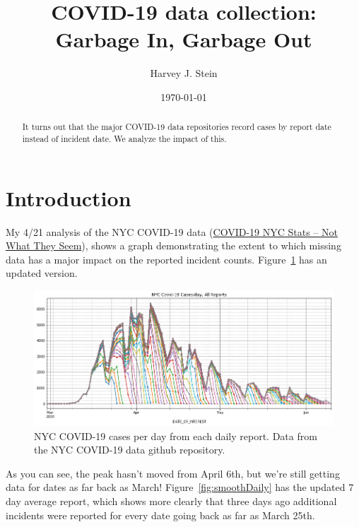\documentclass[10pt,reqno]{amsart}
\author{Harvey J. Stein}
\date{\today}
\begin{document}
\title{COVID-19 data collection: Garbage In, Garbage Out}

\begin{abstract}
  It turns out that the major COVID-19 data repositories record cases
  by report date instead of incident date.  We analyze the impact of
  this.
\end{abstract}

\maketitle
\tableofcontents

\section{Introduction}
\label{sec:intro}
My 4/21 analysis of the NYC COVID-19 data
(\href{https://hjstein.blogspot.com/2020/04/covid-19-nyc-stats-not-what-they-seem.html}{COVID-19 NYC Stats -- Not What They Seem}),
shows a graph demonstrating the extent to which missing
data has a major impact on the reported incident
counts.\nocite{nyc2020data,Stein2020nycdata,Stein2020owiddata,owid2020data}
Figure~\ref{fig:daily} has an updated version.\nocite{Stein2020Seem}\nocite{Stein2020Ray}

\begin{figure}[H]
  \centering
  \includegraphics[width=\textwidth]{../Notebooks/theFullStory.png}
  \caption{NYC COVID-19 cases per day from each daily report.  Data
    from the NYC COVID-19 data github repository.}
  \label{fig:daily}
\end{figure}

As you can see, the peak hasn't moved from April 6th, but we're still
getting data for dates as far back as March!
Figure~\ref{fig:smoothDaily} has the updated 7 day average report,
which shows more clearly that three days ago additional incidents were
reported for every date going back as far as March 25th.
\end{document}
